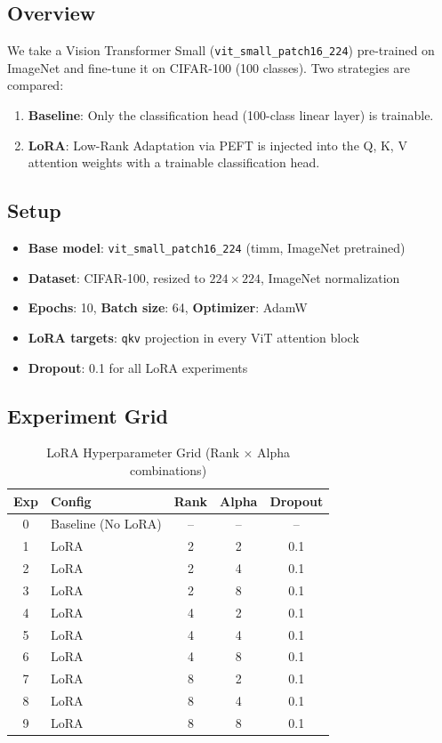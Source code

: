 \documentclass[12pt,a4paper]{article}
\begin{document}
\subsection{Overview}

We take a Vision Transformer Small (\texttt{vit\_small\_patch16\_224}) pre-trained on ImageNet and fine-tune it on CIFAR-100 (100 classes). Two strategies are compared:
\begin{enumerate}
    \item \textbf{Baseline}: Only the classification head (100-class linear layer) is trainable.
    \item \textbf{LoRA}: Low-Rank Adaptation via PEFT is injected into the Q, K, V attention weights with a trainable classification head.
\end{enumerate}

\subsection{Setup}

\begin{itemize}
    \item \textbf{Base model}: \texttt{vit\_small\_patch16\_224} (timm, ImageNet pretrained)
    \item \textbf{Dataset}: CIFAR-100, resized to $224\times224$, ImageNet normalization
    \item \textbf{Epochs}: 10, \textbf{Batch size}: 64, \textbf{Optimizer}: AdamW
    \item \textbf{LoRA targets}: \texttt{qkv} projection in every ViT attention block
    \item \textbf{Dropout}: 0.1 for all LoRA experiments
\end{itemize}

\subsection{Experiment Grid}

\begin{table}[H]
\centering
\caption{LoRA Hyperparameter Grid (Rank $\times$ Alpha combinations)}
\begin{tabular}{clccc}
\toprule
\textbf{Exp} & \textbf{Config} & \textbf{Rank} & \textbf{Alpha} & \textbf{Dropout} \\
\midrule
0 & Baseline (No LoRA) & -- & -- & -- \\
1 & LoRA & 2 & 2 & 0.1 \\
2 & LoRA & 2 & 4 & 0.1 \\
3 & LoRA & 2 & 8 & 0.1 \\
4 & LoRA & 4 & 2 & 0.1 \\
5 & LoRA & 4 & 4 & 0.1 \\
6 & LoRA & 4 & 8 & 0.1 \\
7 & LoRA & 8 & 2 & 0.1 \\
8 & LoRA & 8 & 4 & 0.1 \\
9 & LoRA & 8 & 8 & 0.1 \\
\bottomrule
\end{tabular}
\end{table}
\end{document}

